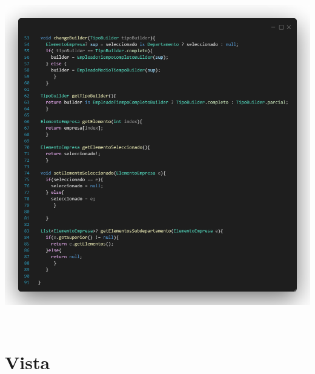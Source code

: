\documentclass[
]{article}
\begin{document}
\pagebreak
\includegraphics[width=5.90522in,height=5.80556in]{imagenes/Director2.png}

\section{Vista}\label{vista}
\end{document}

